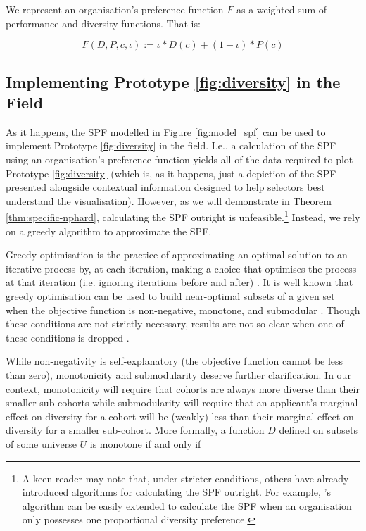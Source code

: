 We represent an organisation's preference function $F$ as a weighted sum of performance and diversity functions. That is:

\begin{equation}\label{eq:f_spec}
F(D, P, c, \iota) := \iota*D(c)+(1-\iota)*P(c)
\end{equation}

\subsection{Implementing Prototype \ref{fig:diversity} in the Field}\label{sec:spf_alg}
As it happens, the SPF modelled in Figure \ref{fig:model_spf} can be used to implement Prototype \ref{fig:diversity} in the field. I.e., a calculation of the SPF using an organisation's preference function yields all of the data required to plot Prototype \ref{fig:diversity} (which is, as it happens, just a depiction of the SPF presented alongside contextual information designed to help selectors best understand the visualisation). However, as we will demonstrate in Theorem \ref{thm:specific-nphard}, calculating the SPF outright is unfeasible.\footnote{A keen reader may note that, under stricter conditions, others have already introduced algorithms for calculating the SPF outright. For example, \textcite{kleinberg2018algorithmic}'s algorithm can be easily extended to calculate the SPF when an organisation only possesses one proportional diversity preference.} Instead, we rely on a greedy algorithm to approximate the SPF.

Greedy optimisation is the practice of approximating an optimal solution to an iterative process by, at each iteration, making a choice that optimises the process at that iteration (i.e. ignoring iterations before and after) \cite{nemhauser1978analysis}. It is well known that greedy optimisation can be used to build near-optimal subsets of a given set when the objective function is non-negative, monotone, and submodular \cite{Feldman_Harshaw_Karbasi_2017,nemhauser1978analysis}. Though these conditions are not strictly necessary, results are not so clear when one of these conditions is dropped \cite{Feldman_Harshaw_Karbasi_2017}.

While non-negativity is self-explanatory (the objective function cannot be less than zero), monotonicity and submodularity deserve further clarification. In our context, monotonicity will require that cohorts are always more diverse than their smaller sub-cohorts while submodularity will require that an applicant's marginal effect on diversity for a cohort will be (weakly) less than their marginal effect on diversity for a smaller sub-cohort. More formally, a function $D$ defined on subsets of some universe $U$ is monotone if and only if 

